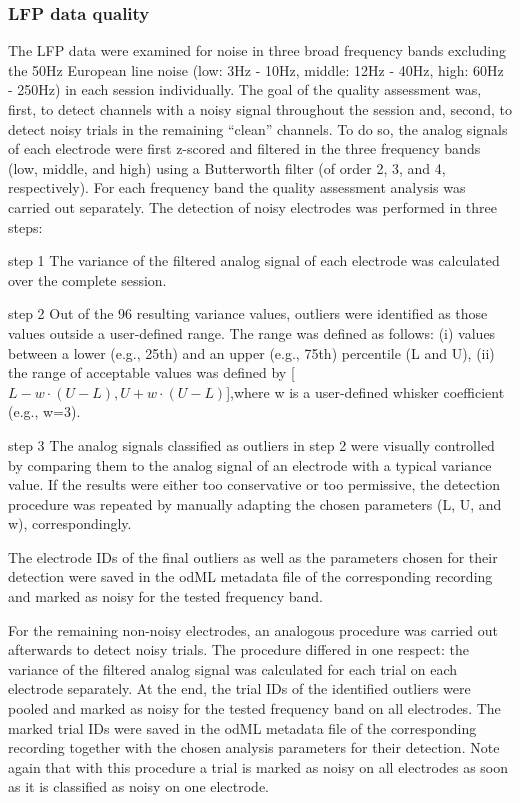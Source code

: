 \subsubsection{LFP data quality}

The LFP data were examined for noise in three broad frequency bands excluding the 50Hz European line noise (low: 3Hz - 10Hz, middle: 12Hz - 40Hz, high: 60Hz - 250Hz) in each session individually. The goal of the quality assessment was, first, to detect channels with a noisy signal throughout the session and, second, to detect noisy trials in the remaining “clean” channels. To do so, the analog signals of each electrode were first z-scored and filtered in the three frequency bands (low, middle, and high) using a Butterworth filter (of order 2, 3, and 4, respectively). For each frequency band the quality assessment analysis was carried out separately. The detection of noisy electrodes was performed in three steps: 

step 1 The variance of the filtered analog signal of each electrode was calculated over the complete session. 

step 2 Out of the 96 resulting variance values, outliers were identified as those values outside a user-defined range. The range was defined as follows: (i) values between a lower (e.g., 25th) and an upper (e.g., 75th) percentile (L and U), (ii) the range of acceptable values was defined by [$L-w\cdot(U-L),U+w\cdot(U-L)$],where w is a user-defined whisker coefficient (e.g., w=3). 

step 3 The analog signals classified as outliers in step 2 were visually controlled by comparing them to the analog signal of an electrode with a typical variance value. If the results were either too conservative or too permissive, the detection procedure was repeated by manually adapting the chosen parameters (L, U, and w), correspondingly. 

The electrode IDs of the final outliers as well as the parameters chosen for their detection were saved in the odML metadata file of the corresponding recording and marked as noisy for the tested frequency band. 

For the remaining non-noisy electrodes, an analogous procedure was carried out afterwards to detect noisy trials. The procedure differed in one respect: the variance of the filtered analog signal was calculated for each trial on each electrode separately. At the end, the trial IDs of the identified outliers were pooled and marked as noisy for the tested frequency band on all electrodes. The marked trial IDs were saved in the odML metadata file of the corresponding recording together with the chosen analysis parameters for their detection. Note again that with this procedure a trial is marked as noisy on all electrodes as soon as it is classified as noisy on one electrode.

